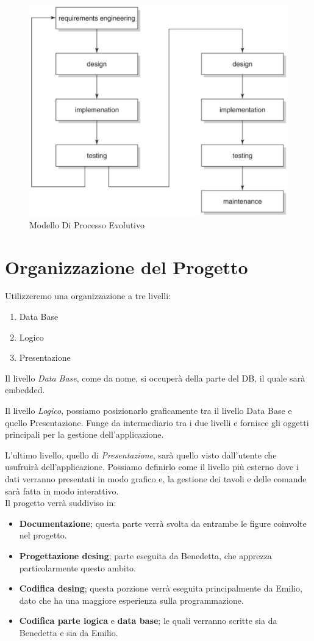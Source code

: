 \documentclass[12pt, letterpaper]{book}
\begin{document}
\begin{figure}[h]
    \centering
    \includegraphics[width = 0.7\linewidth]{../../Immagini/Modello_Processo_Evolutivo.jpg}
    \caption{Modello Di Processo Evolutivo}
    \label{fig: modello_processo_evolutivo}
\end{figure}

\section{Organizzazione del Progetto}\label{sez: organizzazioneProgetto}

Utilizzeremo una organizzazione a tre livelli:

\begin{enumerate}
    \item Data Base
    \item Logico
    \item Presentazione
\end{enumerate}
Il livello \textit{Data Base}, come da nome, si occuperà della parte del DB, il quale sarà embedded.

Il livello \textit{Logico}, possiamo posizionarlo graficamente tra il livello Data Base e quello Presentazione. Funge da intermediario tra i due livelli e fornisce gli oggetti principali per la gestione dell'applicazione.

L'ultimo livello, quello di \textit{Presentazione}, sarà quello visto dall'utente che usufruirà dell'applicazione. Possiamo definirlo come il livello più esterno dove i dati verranno presentati in modo grafico e, la gestione dei tavoli e delle comande sarà fatta in modo interattivo.\\

Il progetto verrà suddiviso in:
\begin{itemize}
    \item \textbf{Documentazione}; questa parte verrà svolta da entrambe le figure coinvolte nel progetto. 
    \item \textbf{Progettazione desing}; parte eseguita da Benedetta, che apprezza particolarmente questo ambito.
    \item \textbf{Codifica desing}; questa porzione verrà eseguita principalmente da Emilio, dato che ha una maggiore esperienza sulla programmazione.
    \item \textbf{Codifica parte logica} e \textbf{data base}; le quali verranno scritte sia da Benedetta e sia da Emilio.
\end{itemize}
\end{document}
